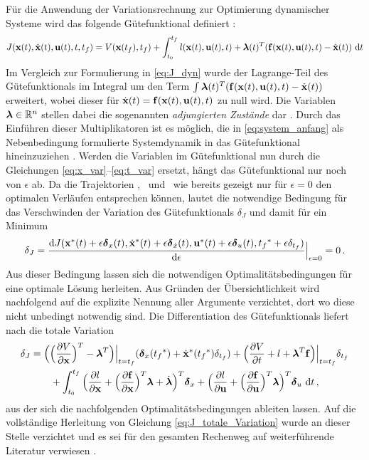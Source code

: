 Für die Anwendung der Variationsrechnung zur Optimierung dynamischer Systeme wird das folgende Gütefunktional definiert \cite{KnutGraichen.2012}:
\begin{equation}
J(\boldsymbol{\mathrm{x}}(t),\dot{\boldsymbol{\mathrm{x}}}(t),\boldsymbol{\mathrm{u}}(t),t,t_f) = V(\boldsymbol{\mathrm{x}}(t_f),t_f) + \int_{t_0}^{t_f}l(\boldsymbol{\mathrm{x}}(t),\boldsymbol{\mathrm{u}}(t),t) + \boldsymbol{\mathrm{\lambda}}(t)^T(\boldsymbol{\mathrm{f}}(\boldsymbol{\mathrm{x}}(t),\boldsymbol{\mathrm{u}}(t),t) - \dot{\boldsymbol{\mathrm{x}}}(t))~\textrm{d}{t} \label{eq:J_var_sys}
\end{equation}
Im Vergleich zur Formulierung in \eqref{eq:J_dyn} wurde der Lagrange-Teil des Gütefunktionals im Integral um den Term $\int\boldsymbol{\mathrm{\lambda}}(t)^T(\boldsymbol{\mathrm{f}}(\boldsymbol{\mathrm{x}}(t),\boldsymbol{\mathrm{u}}(t),t) - \dot{\boldsymbol{\mathrm{x}}}(t))$ erweitert, wobei dieser für $\dot{\boldsymbol{\mathrm{x}}}(t) = \boldsymbol{\mathrm{f}}(\boldsymbol{\mathrm{x}}(t),\boldsymbol{\mathrm{u}}(t),t)$ zu null wird. Die Variablen $\boldsymbol{\mathrm{\lambda}}\in\mathbb{R}^n$ stellen dabei die sogenannten \textit{adjungierten Zustände} dar \cite{KnutGraichen.2012}. Durch das Einführen dieser Multiplikatoren ist es möglich, die in \eqref{eq:system_anfang} als Nebenbedingung formulierte Systemdynamik in das Gütefunktional hineinzuziehen \cite{Follinger.1994}. Werden die Variablen im Gütefunktional nun durch die Gleichungen \eqref{eq:x_var}--\eqref{eq:t_var} ersetzt, hängt das Gütefunktional nur noch von $\epsilon$ ab. Da die Trajektorien \xoft, \dxoft~und \uoft~wie bereits gezeigt nur für $\epsilon=0$ den optimalen Verläufen entsprechen können, lautet die notwendige Bedingung für das Verschwinden der Variation des Gütefunktionals $\delta_J$ und damit für ein Minimum 
\begin{equation}
	\delta_J = \frac{\textrm{d}J({\boldsymbol{\mathrm{x}}}^*(t)+\epsilon\boldsymbol{\mathrm{\delta}}_{x}(t),\dot{\boldsymbol{\mathrm{x}}}^*(t) + \epsilon\boldsymbol{\mathrm{\delta}}_{\dot{x}}(t),{\boldsymbol{\mathrm{u}}}^*(t) + \epsilon\boldsymbol{\mathrm{\delta}}_{u}(t),{t_f}^* + \epsilon\delta_{t_f})}{\textrm{d}{\epsilon}}\Big|_{\epsilon=0}=0\,. \label{eq:VariationJ}
\end{equation}
Aus dieser Bedingung lassen sich die notwendigen Optimalitätsbedingungen für eine optimale Lösung herleiten. Aus Gründen der Übersichtlichkeit wird nachfolgend auf die explizite Nennung aller Argumente verzichtet, dort wo diese nicht unbedingt notwendig sind. Die Differentiation des Gütefunktionals liefert nach \cite{KnutGraichen.2012} die totale Variation 
\begin{equation}
\begin{split}
\delta_J &=  \Big(\Big(\frac{\partial V}{\partial \boldsymbol{\mathrm{x}}}\Big)^T - \boldsymbol{\mathrm{\lambda}}^T\Big)\Big|_{t=t_f}(\boldsymbol{\mathrm{\delta}}_{x}({t_f}^*)+\dot{\boldsymbol{\mathrm{x}}}^*({t_f}^*)\delta_{t_f}) + \Big(\frac{\partial V}{\partial t} + l + \boldsymbol{\mathrm{\lambda}}^T\boldsymbol{\mathrm{f}}\Big)\Big|_{t=t_f}\delta_{t_f} \\
& \qquad + \int_{t_0}^{t_f} \Big(\frac{\partial l}{\partial \boldsymbol{\mathrm{x}}} + \Big(\frac{\partial \boldsymbol{\mathrm{f}}}{\partial \boldsymbol{\mathrm{x}}}\Big)^T \boldsymbol{\mathrm{\lambda}} + \dot{\boldsymbol{\mathrm{\lambda}}}\Big)^T \boldsymbol{\mathrm{\delta}}_{x} + \Big(\frac{\partial l}{\partial \boldsymbol{\mathrm{u}}} + \Big(\frac{\partial \boldsymbol{\mathrm{f}}}{\partial \boldsymbol{\mathrm{u}}}\Big)^T \boldsymbol{\mathrm{\lambda}}\Big)^T \boldsymbol{\mathrm{\delta}}_{u} ~\textrm{d}{t}\,, \label{eq:J_totale_Variation}
\end{split}
\end{equation}
aus der sich die nachfolgenden Optimalitätsbedingungen ableiten lassen. Auf die vollständige Herleitung von Gleichung \eqref{eq:J_totale_Variation} wurde an dieser Stelle verzichtet und es sei für den gesamten Rechenweg auf weiterführende Literatur verwiesen \cite{KnutGraichen.2012,Papageorgiou.2012,Gerdts.2010}.
